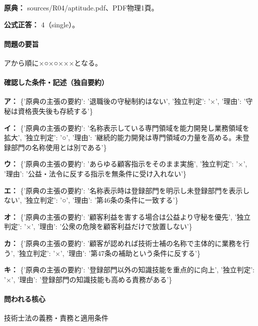 \noindent\textbf{原典：} sources/R04/aptitude.pdf、PDF物理1頁。

\textbf{公式正答：} 4（single）。

\paragraph{問題の要旨} アから順に×○×○×××となる。

\paragraph{確認した条件・記述（独自要約）}\mbox{}\par

\noindent\textbf{ア：} \{'原典の主張の要約': '退職後の守秘制約はない', '独立判定': '×', '理由': '守秘は資格喪失後も存続する'\}\par

\noindent\textbf{イ：} \{'原典の主張の要約': '名称表示している専門領域を能力開発し業務領域を拡大', '独立判定': '○', '理由': '継続的能力開発は専門領域の力量を高める。未登録部門の名称使用とは別である'\}\par

\noindent\textbf{ウ：} \{'原典の主張の要約': 'あらゆる顧客指示をそのまま実施', '独立判定': '×', '理由': '公益・法令に反する指示を無条件に受け入れない'\}\par

\noindent\textbf{エ：} \{'原典の主張の要約': '名称表示時は登録部門を明示し未登録部門を表示しない', '独立判定': '○', '理由': '第46条の条件に一致する'\}\par

\noindent\textbf{オ：} \{'原典の主張の要約': '顧客利益を害する場合は公益より守秘を優先', '独立判定': '×', '理由': '公衆の危険を顧客利益だけで放置しない'\}\par

\noindent\textbf{カ：} \{'原典の主張の要約': '顧客が認めれば技術士補の名称で主体的に業務を行う', '独立判定': '×', '理由': '第47条の補助という条件に反する'\}\par

\noindent\textbf{キ：} \{'原典の主張の要約': '登録部門以外の知識技能を重点的に向上', '独立判定': '×', '理由': '登録部門の知識技能も高める責務がある'\}\par

\paragraph{問われる核心} 技術士法の義務・責務と適用条件

